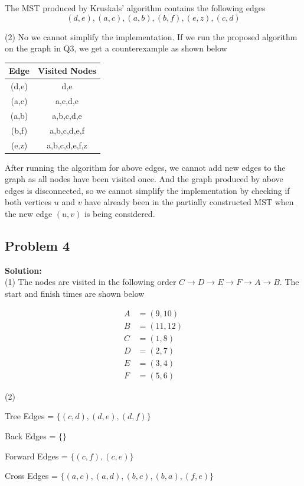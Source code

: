 \documentclass[12pt,a4paper]{article}
\newcommand{\solution}{\noindent\textbf{Solution:}\\\indent}
\begin{document}
The MST produced by Kruskals' algorithm contains the following edges
\begin{equation*}
    (d,e), (a,c), (a,b), (b,f), (e,z), (c,d)
\end{equation*}

(2) No we cannot simplify the implementation. If we run the proposed algorithm on the graph in Q3, we get a counterexample as shown below \\

\begin{tabular}{c|c}
    \textbf{Edge} & \textbf{Visited Nodes} \\
    \hline
    (d,e) & {d,e} \\
    (a,c) & {a,c,d,e} \\
    (a,b) & {a,b,c,d,e} \\
    (b,f) & {a,b,c,d,e,f} \\
    (e,z) & {a,b,c,d,e,f,z} \\
\end{tabular}

After running the algorithm for above edges, we cannot add new edges to the graph as all nodes have been visited once. And the graph produced by above edges is disconnected, so we cannot simplify the implementation by checking if both vertices $u$ and $v$ have already been in the partially constructed MST when the new edge $(u,v)$ is being considered.

\subsection*{Problem 4}
\solution
(1) The nodes are visited in the following order $C \rightarrow D \rightarrow E \rightarrow F \rightarrow A \rightarrow B$. The start and finish times are shown below

\begin{align*}
    A &= (9,10) \\
    B &= (11, 12) \\
    C &= (1,8) \\
    D &= (2,7) \\
    E &= (3,4) \\
    F &= (5,6)
\end{align*}

(2)

Tree Edges = $\{(c,d), (d,e), (d,f) \}$

Back Edges = $\{ \}$

Forward Edges = $\{(c,f), (c,e) \}$

Cross Edges = $\{(a,c), (a,d), (b,c), (b,a), (f,e) \}$
\end{document}
